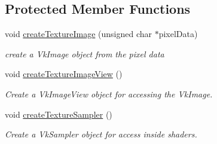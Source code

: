 \subsection*{Protected Member Functions}
\begin{DoxyCompactItemize}
\item 
void \mbox{\hyperlink{class_texture_a1dca34523d388fef051bbb0234e91047}{create\+Texture\+Image}} (unsigned char $\ast$pixel\+Data)
\begin{DoxyCompactList}\small\item\em create a Vk\+Image object from the pixel data \end{DoxyCompactList}\item 
\mbox{\label{class_texture_a4650712e72f3873cc026ed58afaf32cb}} 
void \mbox{\hyperlink{class_texture_a4650712e72f3873cc026ed58afaf32cb}{create\+Texture\+Image\+View}} ()
\begin{DoxyCompactList}\small\item\em Create a Vk\+Image\+View object for accessing the Vk\+Image. \end{DoxyCompactList}\item 
\mbox{\label{class_texture_a837fe912636615bca8b9a2e8fb340daf}} 
void \mbox{\hyperlink{class_texture_a837fe912636615bca8b9a2e8fb340daf}{create\+Texture\+Sampler}} ()
\begin{DoxyCompactList}\small\item\em Create a Vk\+Sampler object for access inside shaders. \end{DoxyCompactList}\end{DoxyCompactItemize}
